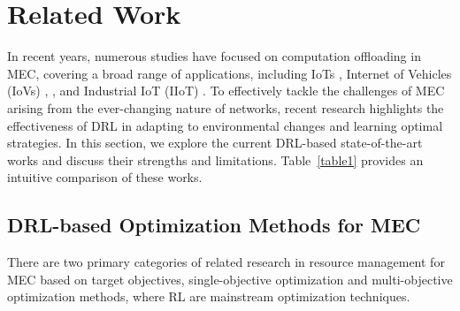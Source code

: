 \documentclass[10pt, journal,letterpaper]{IEEEtran}
\begin{document}
\section{Related Work}
\label{section:II}
  In recent years, numerous studies have focused on computation offloading in MEC, covering a broad range of applications, including IoTs \cite{zhang2023multi}, Internet of Vehicles (IoVs) \cite{lin2022multi}, \cite{wei2023many}, and Industrial IoT (IIoT) \cite{yuan2023adaptive}. 
To effectively tackle the challenges of MEC arising from the ever-changing nature of networks, recent research highlights the effectiveness of DRL in adapting to environmental changes and learning optimal strategies. In this section, we explore the current DRL-based state-of-the-art works and discuss their strengths and limitations. Table~\ref{table1} provides an intuitive comparison of these works.
\subsection{DRL-based Optimization Methods for MEC} 

There are two primary categories of related research in resource management for MEC based on target objectives, single-objective optimization and multi-objective optimization methods, where RL are mainstream optimization techniques.
\end{document}
